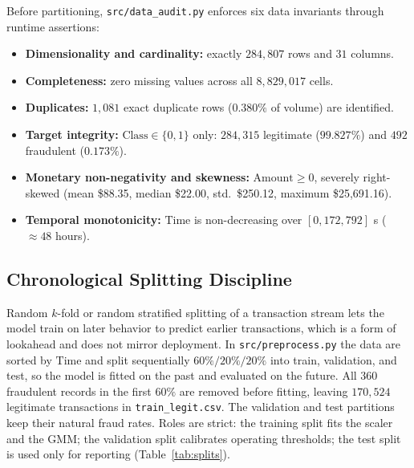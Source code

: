 \documentclass[conference]{IEEEtran}
\begin{document}
Before partitioning, \texttt{src/data\_audit.py} enforces six data invariants through runtime assertions:
\begin{itemize}
    \item \textbf{Dimensionality and cardinality:} exactly $284{,}807$ rows and $31$ columns.
    \item \textbf{Completeness:} zero missing values across all $8{,}829{,}017$ cells.
    \item \textbf{Duplicates:} $1{,}081$ exact duplicate rows ($0.380\%$ of volume) are identified.
    \item \textbf{Target integrity:} $\text{Class} \in \{0,1\}$ only: $284{,}315$ legitimate ($99.827\%$) and $492$ fraudulent ($0.173\%$).
    \item \textbf{Monetary non-negativity and skewness:} $\text{Amount} \ge 0$, severely right-skewed (mean \$88.35, median \$22.00, std.\ \$250.12, maximum \$25,691.16).
    \item \textbf{Temporal monotonicity:} $\text{Time}$ is non-decreasing over $[0, 172{,}792]$ s ($\approx 48$ hours).
\end{itemize}

\subsection{Chronological Splitting Discipline}
Random $k$-fold or random stratified splitting of a transaction stream lets the model train on later behavior to predict earlier transactions, which is a form of lookahead and does not mirror deployment. In \texttt{src/preprocess.py} the data are sorted by $\text{Time}$ and split sequentially $60\%/20\%/20\%$ into train, validation, and test, so the model is fitted on the past and evaluated on the future. All $360$ fraudulent records in the first $60\%$ are removed before fitting, leaving $170{,}524$ legitimate transactions in \texttt{train\_legit.csv}. The validation and test partitions keep their natural fraud rates. Roles are strict: the training split fits the scaler and the GMM; the validation split calibrates operating thresholds; the test split is used only for reporting (Table~\ref{tab:splits}).
\end{document}
